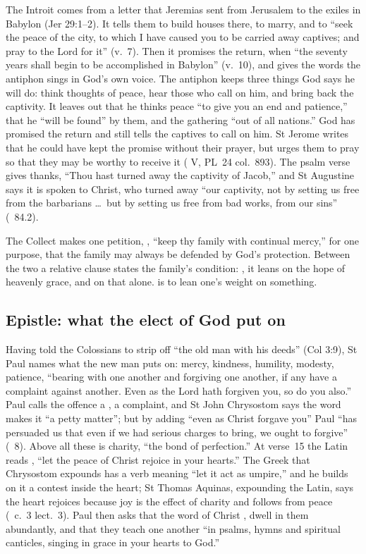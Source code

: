 The Introit comes from a letter that Jeremias sent from Jerusalem to the
exiles in Babylon (Jer 29:1--2). It tells them to build houses there, to
marry, and to ``seek the peace of the city, to which I have caused you to be
carried away captives; and pray to the Lord for it'' (v.~7). Then it promises
the return, when ``the seventy years shall begin to be accomplished in
Babylon'' (v.~10), and gives the words the antiphon sings in God's own voice.
The antiphon keeps three things God says he will do: think thoughts of peace,
hear those who call on him, and bring back the captivity. It leaves out that
he thinks peace ``to give you an end and patience,'' that he ``will be found''
by them, and the gathering ``out of all nations.'' God has promised the
return and still tells the captives to call on him. St Jerome writes that he
could have kept the promise without their prayer, but urges them to pray so
that they may be worthy to receive it ( V, PL~24
col.~893). The psalm verse gives thanks, ``Thou hast turned away the captivity
of Jacob,'' and St Augustine says it is spoken to Christ, who turned away
``our captivity, not by setting us free from the barbarians \dots\ but by
setting us free from bad works, from our sins'' (\ 84.2).

The Collect makes one petition, , ``keep thy family with continual mercy,'' for one purpose, that the
family may always be defended by God's protection. Between the two a relative
clause states the family's condition: , it leans on the hope of heavenly grace, and on that
alone.  is to lean one's weight on something.

\subsection{Epistle: what the elect of God put on}

Having told the Colossians to strip off ``the old man with his deeds'' (Col
3:9), St Paul names what the new man puts on: mercy, kindness, humility,
modesty, patience, ``bearing with one another and forgiving one another, if
any have a complaint against another. Even as the Lord hath forgiven you, so
do you also.'' Paul calls the offence a , a complaint, and St
John Chrysostom says the word makes it ``a petty matter''; but by adding
``even as Christ forgave you'' Paul ``has persuaded us that even if we had
serious charges to bring, we ought to forgive'' (\ 8).
Above all these is charity, ``the bond of perfection.'' At verse~15 the Latin
reads , ``let the peace of
Christ rejoice in your hearts.'' The Greek that Chrysostom expounds has a verb
meaning ``let it act as umpire,'' and he builds on it a contest inside the
heart; St Thomas Aquinas, expounding the Latin, says the heart rejoices
because joy is the effect of charity and follows from peace (\ c.~3 lect.~3). Paul then asks that the word of Christ , dwell in them abundantly, and that they teach one another
``in psalms, hymns and spiritual canticles, singing in grace in your hearts to
God.''

